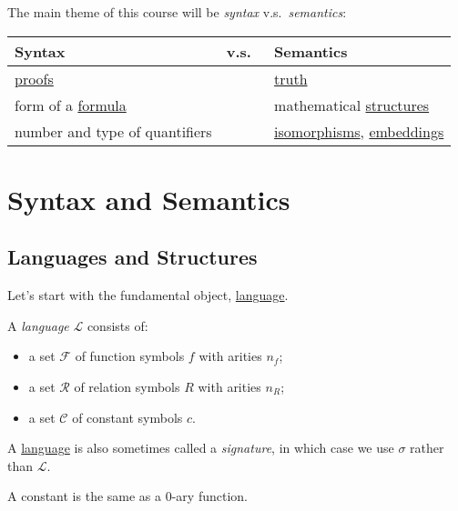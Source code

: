 The main theme of this course will be \emph{syntax} v.s.\ \emph{semantics}:
\begin{table}[H]
	\centering
	\begin{tabular}{lcl}
		\toprule
		Syntax                                    & v.s.\  & Semantics                                                                      \\
		\midrule
		\hyperref[def:proof]{proofs}              &        & \hyperref[def:truth]{truth}                                                    \\
		form of a \hyperref[def:formula]{formula} &        & mathematical \hyperref[def:structure]{structures}                              \\
		number and type of quantifiers            &        & \hyperref[def:isomorphism]{isomorphisms}, \hyperref[def:embedding]{embeddings} \\
		\bottomrule
	\end{tabular}
\end{table}

\section{Syntax and Semantics}
\subsection{Languages and Structures}
Let's start with the fundamental object, \hyperref[def:language]{language}.

\begin{definition}[Language]\label{def:language}
	A \emph{language} \(\mathcal{L} \) consists of:
	\begin{itemize}
		\item a set \(\mathcal{F} \) of function symbols \(f\) with arities \(n_f\);
		\item a set \(\mathcal{R} \) of relation symbols \(R\) with arities \(n_R\);
		\item a set \(\mathcal{C} \) of constant symbols \(c\).
	\end{itemize}
\end{definition}

A \hyperref[def:language]{language} is also sometimes called a \emph{signature}, in which case we use \(\sigma \) rather than \(\mathcal{L} \).

\begin{note}
	A constant is the same as a \(0\)-ary function.
\end{note}


